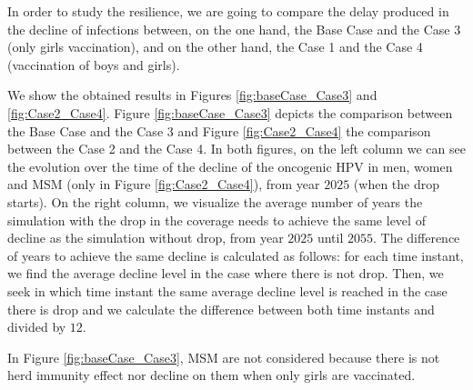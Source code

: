 In order to study the resilience, we are going to compare the delay produced in the decline of infections between, on the one hand, the Base Case and the Case 3 (only girls vaccination), and on the other hand, the Case 1 and the Case 4 (vaccination of boys and girls). 

We show the obtained results in Figures \ref{fig:baseCase_Case3} and \ref{fig:Case2_Case4}. Figure \ref{fig:baseCase_Case3} depicts the comparison between the Base Case and the Case 3 and Figure \ref{fig:Case2_Case4} the comparison between the Case 2 and the Case 4. In both figures, on the left column we can see the evolution over the time of the decline of the oncogenic HPV in men, women and MSM (only in Figure \ref{fig:Case2_Case4}), from year $2025$ (when the drop starts). On the right column, we visualize the average number of years the simulation with the drop in the coverage needs to achieve the same level of decline as the simulation without drop, from year $2025$ until $2055$. The difference of years to achieve the same decline is calculated as follows: for each time instant, we find the average decline level in the case where there is not drop. Then, we seek in which time instant the same average decline level is reached in the case there is drop and we calculate the difference between both time instants and divided by $12$.

In Figure \ref{fig:baseCase_Case3}, MSM are not considered because there is not herd immunity effect nor decline on them when only girls are vaccinated.  

